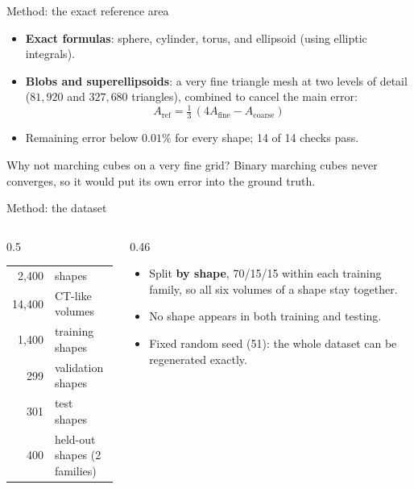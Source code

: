 \documentclass[aspectratio=169,11pt]{beamer}
\begin{document}
\begin{frame}{Method: the exact reference area}
  \begin{itemize}
    \item \textbf{Exact formulas}: sphere, cylinder, torus, and ellipsoid (using elliptic integrals).
    \item \textbf{Blobs and superellipsoids}: a very fine triangle mesh at two levels of detail
          ($81{,}920$ and $327{,}680$ triangles), combined to cancel the main error:
          \[ A_\text{ref} = \tfrac13\,(4A_\text{fine} - A_\text{coarse}) \]
    \item Remaining error below $0.01\%$ for every shape; 14 of 14 checks pass.
  \end{itemize}
  \vspace{0.5em}
  \begin{alertblock}{Why not marching cubes on a very fine grid?}
    Binary marching cubes never converges, so it would put its own error into the ground truth.
  \end{alertblock}
\end{frame}

\begin{frame}{Method: the dataset}
  \begin{columns}[T]
    \begin{column}{0.5\textwidth}
      \centering
      \begin{tabular}{rl}
        \toprule
        2{,}400 & shapes \\
        14{,}400 & CT-like volumes \\
        1{,}400 & training shapes \\
        299 & validation shapes \\
        301 & test shapes \\
        400 & held-out shapes (2 families) \\
        \bottomrule
      \end{tabular}
    \end{column}
    \begin{column}{0.46\textwidth}
      \begin{itemize}
        \item Split \textbf{by shape}, 70/15/15 within each training family, so all six
              volumes of a shape stay together.
        \item No shape appears in both training and testing.
        \item Fixed random seed (51): the whole dataset can be regenerated exactly.
      \end{itemize}
    \end{column}
  \end{columns}
\end{frame}
\end{document}
